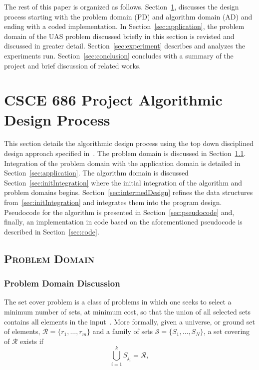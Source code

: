 \documentclass[conference]{IEEEtran}
\begin{document}
The rest of this paper is organized as follows.
Section~\ref{sec:designProcess}, discusses the design process starting with the
problem domain (PD) and algorithm domain (AD) and ending with a coded
implementation. In Section~\ref{sec:application}, the problem domain of the UAS
problem discussed briefly in this section is revisted and discussed in greater
detail.  Section~\ref{sec:experiment} describes and analyzes the experiments
run.  Section~\ref{sec:conclusion} concludes with a summary of the project and
brief discussion of related works.

\section{CSCE 686 Project Algorithmic Design Process} \label{sec:designProcess}


This section details the algorithmic design process using the top down
disciplined design approach specified in~\cite{lamontDesign, lamontSCP}. The
problem domain is discussed in Section~\ref{sec:problemDomain}. Integration of
the problem domain with the application domain is detailed in
Section~\ref{sec:application}. The algorithm domain is discussed
Section~\ref{sec:initIntegration} where the initial integration of the
algorithm and problem domains begins.  Section~\ref{sec:intermedDesign} refines
the data structures from~\ref{sec:initIntegration} and integrates them into the
program design.  Pseudocode for the algorithm is presented in
Section~\ref{sec:pseudocode} and, finally, an implementation in code based on
the aforementioned pseudocode is described in Section~\ref{sec:code}.




\subsection{\textsc{Problem Domain}} \label{sec:problemDomain}

\subsubsection{Problem Domain Discussion}

The set cover problem is a class of problems in which one seeks to select a
minimum number of sets, at minimum cost, so that the union of all selected sets
contains all elements in the input~\cite{stern2006}.  More formally, given a
universe, or ground set of elements, ${\mathcal{R} = \lbrace r_1,\ldots,r_m
\rbrace}$ and a family of sets ${\mathcal{S} = \lbrace S_1,\ldots,S_N
\rbrace}$, a set covering of $\mathcal{R}$ exists if \[ \bigcup\limits_{i =
1}^k S_{j_i} = \mathcal{R},\]
\end{document}
